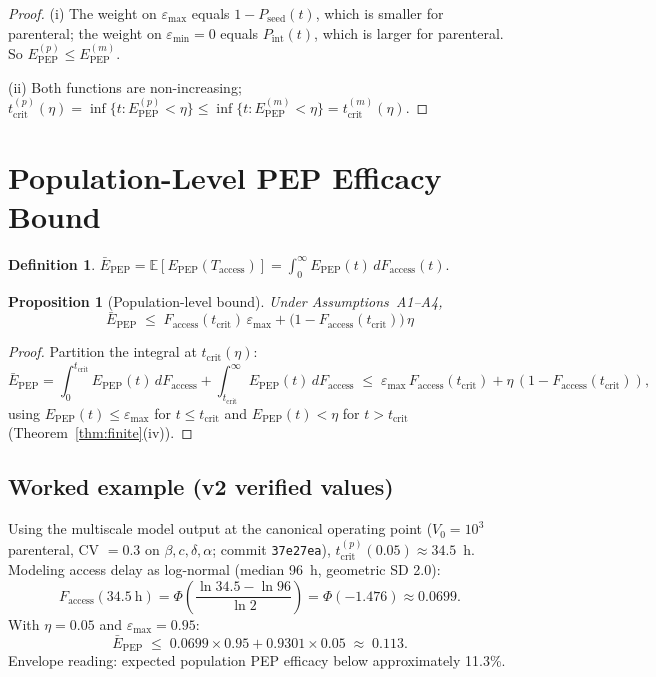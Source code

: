 \documentclass[11pt]{article}
\newtheorem{proposition}{Proposition}[section]
\theoremstyle{definition}
\newtheorem{definition}{Definition}[section]
\theoremstyle{remark}
\newcommand{\Pseed}{P_{\text{seed}}}
\newcommand{\Pint}{P_{\text{int}}}
\newcommand{\Epep}{E_{\text{PEP}}}
\newcommand{\Ebarpep}{\bar{E}_{\text{PEP}}}
\newcommand{\Faccess}{F_{\text{access}}}
\newcommand{\tcrit}{t_{\text{crit}}}
\newcommand{\emax}{\varepsilon_{\max}}
\newcommand{\emin}{\varepsilon_{\min}}
\begin{document}
\begin{proof}
(i) The weight on $\emax$ equals $1 - \Pseed(t)$, which is smaller for parenteral; the weight on $\emin = 0$ equals $\Pint(t)$, which is larger for parenteral. So $\Epep^{(p)} \leq \Epep^{(m)}$.

(ii) Both functions are non-increasing; $\tcrit^{(p)}(\eta) = \inf\{t : \Epep^{(p)} < \eta\} \leq \inf\{t : \Epep^{(m)} < \eta\} = \tcrit^{(m)}(\eta)$.
\end{proof}

\section{Population-Level PEP Efficacy Bound}

\begin{definition}
$\Ebarpep = \mathbb{E}[\Epep(T_{\text{access}})] = \int_{0}^{\infty} \Epep(t)\,d\Faccess(t)$.
\end{definition}

\begin{proposition}[Population-level bound]\label{prop:bound}
Under Assumptions~A1--A4,
\begin{equation}
\Ebarpep \;\leq\; \Faccess(\tcrit)\,\emax + \big(1 - \Faccess(\tcrit)\big)\,\eta
\label{eq:bound_si}
\end{equation}
\end{proposition}

\begin{proof}
Partition the integral at $\tcrit(\eta)$:
\[
\Ebarpep = \int_{0}^{\tcrit} \Epep(t)\,d\Faccess + \int_{\tcrit}^{\infty} \Epep(t)\,d\Faccess
\;\leq\; \emax\,\Faccess(\tcrit) + \eta\,(1 - \Faccess(\tcrit)),
\]
using $\Epep(t) \leq \emax$ for $t \leq \tcrit$ and $\Epep(t) < \eta$ for $t > \tcrit$ (Theorem~\ref{thm:finite}(iv)).
\end{proof}

\subsection{Worked example (v2 verified values)}

Using the multiscale model output at the canonical operating point ($V_{0} = 10^{3}$ parenteral, CV $= 0.3$ on $\beta, c, \delta, \alpha$; commit \texttt{37e27ea}), $\tcrit^{(p)}(0.05) \approx 34.5$~h. Modeling access delay as log-normal (median 96~h, geometric SD 2.0):
\[
\Faccess(34.5~\text{h}) = \Phi\!\left(\frac{\ln 34.5 - \ln 96}{\ln 2}\right) = \Phi(-1.476) \approx 0.0699.
\]
With $\eta = 0.05$ and $\emax = 0.95$:
\[
\Ebarpep \;\leq\; 0.0699 \times 0.95 + 0.9301 \times 0.05 \;\approx\; 0.113.
\]
Envelope reading: expected population PEP efficacy below approximately 11.3\%.
\end{document}
